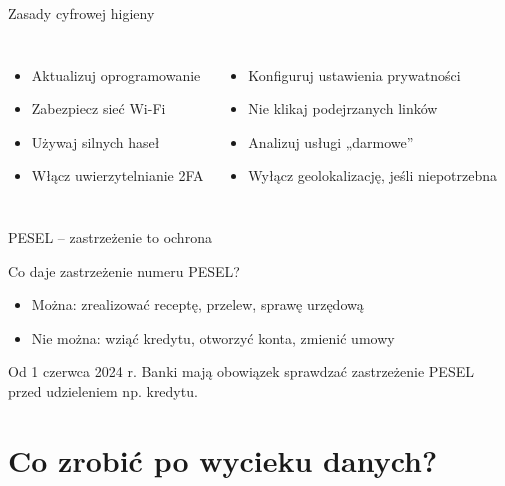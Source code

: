 \begin{frame}{Zasady cyfrowej higieny}
\begin{columns}[c]
    \begin{itemize}
        \item Aktualizuj oprogramowanie
        \item Zabezpiecz sieć Wi-Fi
        \item Używaj silnych haseł
        \item Włącz uwierzytelnianie 2FA
    \end{itemize}
    \begin{itemize}
        \item Konfiguruj ustawienia prywatności
        \item Nie klikaj podejrzanych linków
        \item Analizuj usługi „darmowe”
        \item Wyłącz geolokalizację, jeśli niepotrzebna
    \end{itemize}
\end{columns}
\end{frame}

\begin{frame}{PESEL – zastrzeżenie to ochrona}
\begin{block}{Co daje zastrzeżenie numeru PESEL?}
\begin{itemize}
    \item Można: zrealizować receptę, przelew, sprawę urzędową
    \item Nie można: wziąć kredytu, otworzyć konta, zmienić umowy
\end{itemize}
\end{block}
\pause
\begin{exampleblock}{Od 1 czerwca 2024 r.}
Banki mają obowiązek sprawdzać zastrzeżenie PESEL przed udzieleniem np. kredytu.
\end{exampleblock}
\end{frame}

\section{Co zrobić po wycieku danych?}

